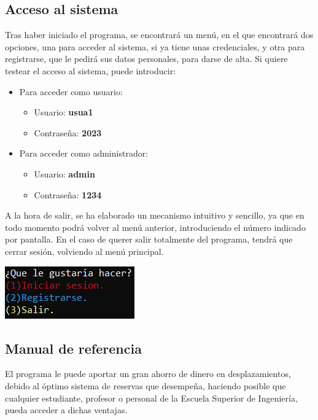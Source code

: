 \bigskip

\subsection{Acceso al sistema}

Tras haber iniciado el programa, se encontrará un menú, en el que encontrará dos opciones, una para acceder al sistema, si ya tiene unas credenciales, y otra para registrarse,
que le pedirá sus datos personales, para darse de alta. Si quiere testear el acceso al sistema, puede introducir:
\begin{itemize}
  \item Para acceder como usuario:
  \begin{itemize}
    \item Usuario: \textbf{usua1}
    \item Contraseña: \textbf{2023}
  \end{itemize}
  \item Para acceder como administrador:
  \begin{itemize}
    \item Usuario: \textbf{admin}
    \item Contraseña: \textbf{1234}
  \end{itemize}
\end{itemize}

A la hora de salir, se ha elaborado un mecanismo intuitivo y sencillo, ya que en todo momento podrá volver al menú anterior, introduciendo el número indicado por pantalla.
En el caso de querer salir totalmente del programa, tendrá que cerrar sesión, volviendo al menú principal.
\begin{center}
  \includegraphics[]{FOTOS/menuPrincipal.png}
  \label{fig:menuPrincipal}
\end{center}

\subsection{Manual de referencia}

El programa le puede aportar un gran ahorro de dinero en desplazamientos, debido al óptimo sistema de reservas que desempeña, haciendo posible que cualquier estudiante, profesor o personal
de la Escuela Superior de Ingeniería, pueda acceder a dichas ventajas.

